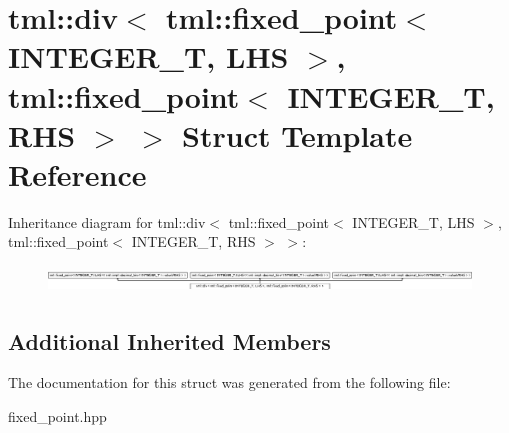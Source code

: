 \hypertarget{structtml_1_1div_3_01tml_1_1fixed__point_3_01INTEGER__T_00_01LHS_01_4_00_01tml_1_1fixed__point_3a7893753b2992303a4bf07afc7107afb}{\section{tml\+:\+:div$<$ tml\+:\+:fixed\+\_\+point$<$ I\+N\+T\+E\+G\+E\+R\+\_\+\+T, L\+H\+S $>$, tml\+:\+:fixed\+\_\+point$<$ I\+N\+T\+E\+G\+E\+R\+\_\+\+T, R\+H\+S $>$ $>$ Struct Template Reference}
\label{structtml_1_1div_3_01tml_1_1fixed__point_3_01INTEGER__T_00_01LHS_01_4_00_01tml_1_1fixed__point_3a7893753b2992303a4bf07afc7107afb}
}
Inheritance diagram for tml\+:\+:div$<$ tml\+:\+:fixed\+\_\+point$<$ I\+N\+T\+E\+G\+E\+R\+\_\+\+T, L\+H\+S $>$, tml\+:\+:fixed\+\_\+point$<$ I\+N\+T\+E\+G\+E\+R\+\_\+\+T, R\+H\+S $>$ $>$\+:\begin{figure}[H]
\begin{center}
\leavevmode
\includegraphics[height=0.700438cm]{structtml_1_1div_3_01tml_1_1fixed__point_3_01INTEGER__T_00_01LHS_01_4_00_01tml_1_1fixed__point_3a7893753b2992303a4bf07afc7107afb}
\end{center}
\end{figure}
\subsection*{Additional Inherited Members}


The documentation for this struct was generated from the following file\+:\begin{DoxyCompactItemize}
\item 
fixed\+\_\+point.\+hpp\end{DoxyCompactItemize}
